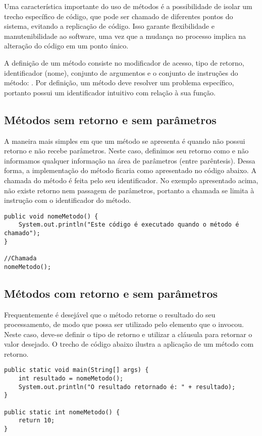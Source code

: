 Uma característica importante do uso de métodos é a possibilidade de isolar um trecho específico de código, que pode ser chamado de diferentes pontos do sistema, evitando a replicação de código. Isso garante flexibilidade e manutenibilidade ao software, uma vez que a mudança no processo implica na alteração do código em um ponto único.

A definição de um método consiste no modificador de acesso, tipo de retorno, identificador (nome), conjunto de argumentos e o conjunto de instruções do método: . Por definição, um método deve resolver um problema específico, portanto possui um identificador intuitivo com relação à sua função.

\subsection{Métodos sem retorno e sem parâmetros}
A maneira mais simples em que um método se apresenta é quando não possui retorno e não recebe parâmetros. Neste caso, definimos seu retorno como  e não informamos qualquer informação na área de parâmetros (entre parêntesis). Dessa forma, a implementação do método ficaria como apresentado no código abaixo. A chamada do método é feita pelo seu identificador. No exemplo apresentado acima, não existe retorno nem passagem de parâmetros, portanto a chamada se limita à instrução com o identificador do método.

\begin{verbatim}
public void nomeMetodo() {
	System.out.println("Este código é executado quando o método é chamado");
}

//Chamada
nomeMetodo();
\end{verbatim}

\subsection{Métodos com retorno e sem parâmetros}
Frequentemente é desejável que o método retorne o resultado do seu processamento, de modo que possa ser utilizado pelo elemento que o invocou. Neste caso, deve-se definir o tipo de retorno e utilizar a cláusula  para retornar o valor desejado. O trecho de código abaixo ilustra a aplicação de um método com retorno.

\begin{verbatim}
public static void main(String[] args) {
	int resultado = nomeMetodo();
	System.out.println("O resultado retornado é: " + resultado);
}

public static int nomeMetodo() {
	return 10;
}
\end{verbatim}

